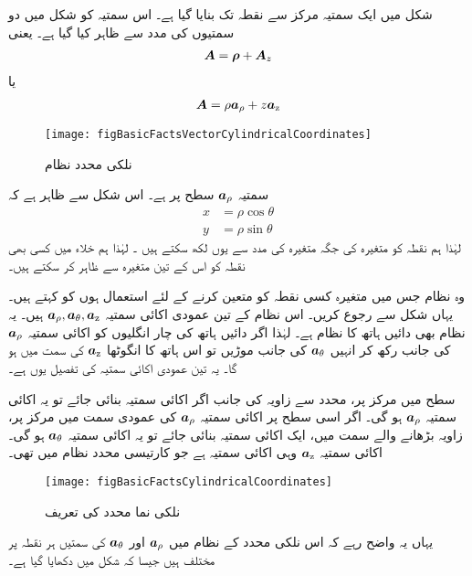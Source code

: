 شکل   میں ایک سمتیہ   مرکز سے نقطہ  تک بنایا گیا ہے۔ اس سمتیہ کو شکل میں دو سمتیوں کی مدد سے ظاہر کیا گیا ہے۔ یعنی
\begin{align}
{\ensuremath{{\boldsymbol{A}}}}={{\boldsymbol{\rho}}}+{{\boldsymbol{A}}}_z
\end{align}
یا
\begin{align}
{\ensuremath{{\boldsymbol{A}}}}=\rho {\boldsymbol{a}}_{\rho}+z {\boldsymbol{a}}_{\textup{z}}
\end{align}
%
\begin{figure}
\centering
\texttt{[image: figBasicFactsVectorCylindricalCoordinates]}
\caption{نلکی محدد نظام}
\label{شکل_حقائق_نلکی_نظام_ایک_سمتیہ}
\end{figure}
سمتیہ ${\boldsymbol{a}}_{\rho}$ سطح  پر ہے۔ اس شکل سے ظاہر ہے کہ
\begin{align}
x&=\rho \cos \theta\\
y&=\rho \sin \theta
\end{align}
لہٰذا ہم نقطہ  کو متغیرہ  کی جگہ متغیرہ  کی مدد سے یوں لکھ سکتے ہیں ۔ لہٰذا ہم خلاء میں کسی بھی نقطہ کو اس کے تین متغیرہ  سے ظاہر کر سکتے ہیں۔

	وہ نظام جس میں متغیرہ   کسی نقطہ کو متعین کرنے کے لئے استعمال ہوں  کو 
 کہتے ہیں۔یہاں شکل   سے رجوع کریں۔ اس نظام کے تین عمودی  اکائی سمتیہ ${\boldsymbol{a}}_{\rho},{\boldsymbol{a}}_{\theta},{\boldsymbol{a}}_{\textup{z}}$ ہیں۔ یہ نظام بھی دائیں ہاتھ کا نظام ہے۔ لہٰذا اگر دائیں ہاتھ کی چار انگلیوں کو اکائی سمتیہ ${\boldsymbol{a}}_{\rho}$ کی جانب رکھ کر انہیں ${\boldsymbol{a}}_{\theta}$ کی جانب موڑیں تو اس ہاتھ کا انگوٹھا ${\boldsymbol{a}}_{\textup{z}}$ کی سمت میں ہو گا۔ یہ تین عمودی اکائی سمتیہ کی تفصیل یوں ہے۔

سطح  میں مرکز پر، محدد  سے  زاویہ  کی  جانب اگر  اکائی سمتیہ بنائی جائے تو یہ اکائی سمتیہ ${\boldsymbol{a}}_{\rho}$ ہو گی۔ اگر اسی سطح   پر اکائی سمتیہ ${\boldsymbol{a}}_{\rho}$ کی عمودی سمت میں مرکز پر، زاویہ   بڑھانے والے سمت میں، ایک اکائی سمتیہ بنائی جائے تو یہ  اکائی سمتیہ ${\boldsymbol{a}}_{\theta}$ ہو گی۔ اکائی سمتیہ ${\boldsymbol{a}}_{\textup{z}}$ وہی اکائی سمتیہ ہے جو کارتیسی محدد نظام میں تھی۔ 
\begin{figure}
\centering
\texttt{[image: figBasicFactsCylindricalCoordinates]}
\caption{نلکی نما محدد کی تعریف}
\label{شکل_حقائق_نلکی_نظام_تعریف}
\end{figure}
	یہاں یہ واضح رہے کہ اس نلکی محدد کے نظام  میں ${\boldsymbol{a}}_{\rho}$ اور  ${\boldsymbol{a}}_{\theta}$ کی سمتیں ہر نقطہ پر مختلف ہیں جیسا کہ شکل  میں دکھایا گیا ہے۔

